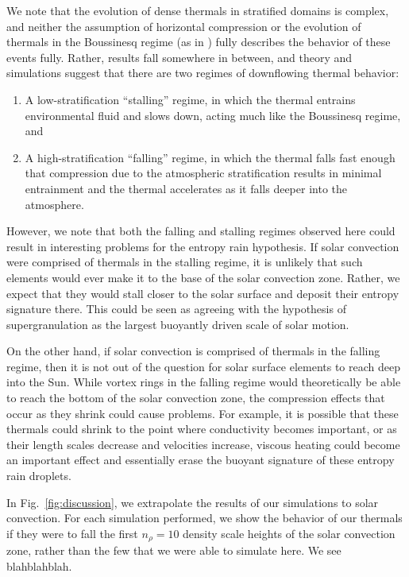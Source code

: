 \documentclass[twocolumn, amsmath, amsfonts, amssymb, trackchanges]{aastex62}
\newcommand{\LJ}{\citetalias{lecoanet&jeevanjee2018}}
\begin{document}
We note that the evolution of dense thermals in stratified domains is complex, and neither the assumption of horizontal compression \citep[as in e.g.,][]{brandenburg2016} or the evolution of thermals in the Boussinesq regime (as in \LJ) fully describes the behavior of these events fully.
Rather, results fall somewhere in between, and theory and simulations suggest that there are two regimes of downflowing thermal behavior:
\begin{enumerate}
\item A low-stratification ``stalling'' regime, in which the thermal entrains environmental fluid and slows down, acting much like the Boussinesq regime, and
\item A high-stratification ``falling'' regime, in which the thermal falls fast enough that compression due to the atmospheric stratification results in minimal entrainment and the thermal accelerates as it falls deeper into the atmosphere.
\end{enumerate}

However, we note that both the falling and stalling regimes observed here could result in interesting problems for the entropy rain hypothesis. 
If solar convection were comprised of thermals in the stalling regime, it is unlikely that such elements would ever make it to the base of the solar convection zone.
Rather, we expect that they would stall closer to the solar surface and deposit their entropy signature there. 
This could be seen as agreeing with the hypothesis of supergranulation as the largest buoyantly driven scale of solar motion.

On the other hand, if solar convection is comprised of thermals in the falling regime, then it is not out of the question for solar surface elements to reach deep into the Sun.
While vortex rings in the falling regime would theoretically be able to reach the bottom of the solar convection zone, the compression effects that occur as they shrink could cause problems.
For example, it is possible that these thermals could shrink to the point where conductivity becomes important, or as their length scales decrease and velocities increase, viscous heating could become an important effect and essentially erase the buoyant signature of these entropy rain droplets.

In Fig.~\ref{fig:discussion}, we extrapolate the results of our simulations to solar convection.
For each simulation performed, we show the behavior of our thermals if they were to fall the first $n_\rho = 10$ density scale heights of the solar convection zone, rather than the few that we were able to simulate here.
We see blahblahblah.
\end{document}
